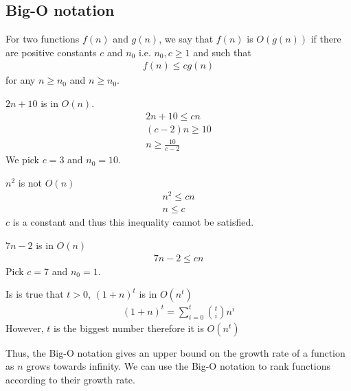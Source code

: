 \documentclass[a4paper]{article}
\theoremstyle{plain}
\theoremstyle{definition}
\newtheorem{defn}{Definition}[section]
\newtheorem{exmp}{Example}[section]
\theoremstyle{remark}
\begin{document}
\subsection{Big-O notation}
\begin{tcolorbox}[colback=black!3!white,colframe=black!60!white,title=\begin{defn}Big O \label{Big O}\end{defn}]
For two functions $f(n)$ and $g(n)$, we say that $f(n)$ is $O(g(n))$ if there are positive constants $c$ and $n_0$ i.e. $n_0,c\ge 1$ and such that
\begin{align}
	f(n) \le cg(n)
\end{align}
for any $n \ge n_0$ and $n \ge n_0$.
\end{tcolorbox}
\begin{tcolorbox}[colback=black!3!white,colframe=black!60!white,title=\begin{exmp}Example 1 \label{Example 1}\end{exmp}]
        $2n+10$ is in $O(n)$.
                \begin{align}
                2n+10 \le  cn \\
		(c-2)n \ge 10 \\
		n\ge \frac{10}{c-2}
                \end{align}
		We pick $c=3$ and $n_0=10$.
\end{tcolorbox}
\begin{tcolorbox}[colback=black!3!white,colframe=black!60!white,title=\begin{exmp}Example 2 \label{Example 2}\end{exmp}]
        $n^2$ is not $O(n)$
                \begin{align}
                n^2\le cn\\
		n\le c
                \end{align}
		$c$ is a constant and thus this inequality cannot be satisfied.
\end{tcolorbox}
\begin{tcolorbox}[colback=black!3!white,colframe=black!60!white,title=\begin{exmp}Example 3 \label{Example 3}\end{exmp}]
        $7n-2$ is in $O(n)$
                \begin{align}
                7n-2 \le cn
                \end{align}
		Pick $c=7$ and $n_0=1$.
\end{tcolorbox}
\begin{tcolorbox}[colback=black!3!white,colframe=black!60!white,title=\begin{exmp}Example 4 \label{Example 4}\end{exmp}]
        Is is true that $t>0$, $(1+n) ^{t}$ is in $O(n^{t})$
                \begin{align}
			(1+n)^{t} = \sum_{i=0}^{t} {t \choose i} n^{i}
                \end{align}
		However, $t$ is the biggest number therefore it is $O(n^{t})$
\end{tcolorbox}
Thus, the Big-O notation gives an upper bound on the growth rate of a function as $n$ grows towards infinity. We can use the Big-O notation to rank functions according to their growth rate.
\end{document}
